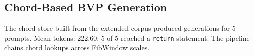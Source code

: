 \subsection{Chord-Based BVP Generation}
The chord store built from the extended corpus produced generations for 5 prompts.
Mean tokens: 222.60; 5 of 5 reached a \texttt{return} statement.
The pipeline chains chord lookups across FibWindow scales.
